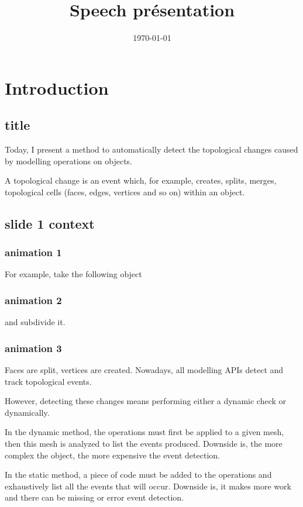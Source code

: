 \documentclass[11pt]{article}
\date{\today}
\title{Speech présentation}
\begin{document}
\maketitle

\section{Introduction}
\label{sec:org00b450b}

\subsection{title}
\label{sec:orgecd1656}
Today, I present a method to automatically detect the topological changes caused
by modelling operations on objects.

A topological change is an event which, for example, creates, splits, merges,
topological cells (faces, edges, vertices and so on) within an object.

\subsection{slide 1 context}
\label{sec:orgdf4da0c}
\subsubsection{animation 1}
\label{sec:org0b10d06}
For example, take the following object

\subsubsection{animation 2}
\label{sec:org6afe864}
and subdivide it.

\subsubsection{animation 3}
\label{sec:org6dec4b5}
Faces are split, vertices are created. Nowadays, all modelling APIs detect and
track topological events.

However, detecting these changes means performing either a dynamic check or dynamically.

In the dynamic method, the operations must first be applied to a given mesh, then this mesh is analyzed to list the events produced. Downside is, the more complex the object, the more expensive the event detection.

In the static method, a piece of code must be added to the operations and
exhaustively list all the events that will occur. Downside is, it makes more
work and there can be missing or error event detection.
\end{document}
